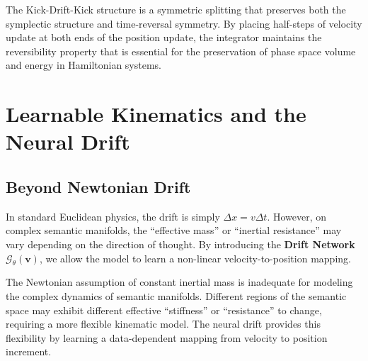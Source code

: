 \documentclass[12pt,a4paper]{article}
\begin{document}
The Kick-Drift-Kick structure is a symmetric splitting that preserves both the symplectic structure and time-reversal symmetry. By placing half-steps of velocity update at both ends of the position update, the integrator maintains the reversibility property that is essential for the preservation of phase space volume and energy in Hamiltonian systems.

\section{Learnable Kinematics and the Neural Drift}

\subsection{Beyond Newtonian Drift}

In standard Euclidean physics, the drift is simply $\Delta x = v \Delta t$. However, on complex semantic manifolds, the ``effective mass'' or ``inertial resistance'' may vary depending on the direction of thought. By introducing the \textbf{Drift Network} $\mathcal{G}_\theta(\mathbf{v})$, we allow the model to learn a non-linear velocity-to-position mapping.

The Newtonian assumption of constant inertial mass is inadequate for modeling the complex dynamics of semantic manifolds. Different regions of the semantic space may exhibit different effective ``stiffness'' or ``resistance'' to change, requiring a more flexible kinematic model. The neural drift provides this flexibility by learning a data-dependent mapping from velocity to position increment.
\end{document}
